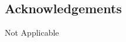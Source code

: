 \documentclass{bmcart}
\begin{document}
\begin{backmatter}
	\subsection*{Acknowledgements}
	Not Applicable







\end{backmatter}
\end{document}

